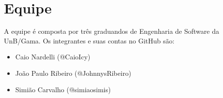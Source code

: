 \chapter[Equipe]{Equipe}

A equipe é composta por três graduandos de Engenharia de Software da UnB/Gama. Os integrantes e suas contas no GitHub são:

\begin{itemize}
\item Caio Nardelli (@CaioIcy)
\item João Paulo Ribeiro (@JohnnysRibeiro)
\item Simião Carvalho (@simiaosimis)
\end{itemize}
